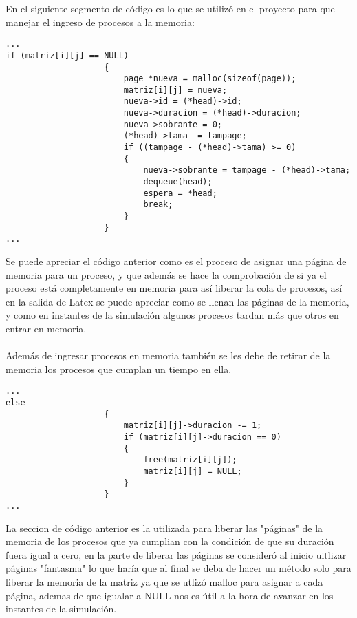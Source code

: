 \documentclass[10pt,a4paper]{article}
\begin{document}
En el siguiente segmento de código es lo que se utilizó en el proyecto para que manejar el ingreso de procesos a la memoria: 
\begin{verbatim}
...
if (matriz[i][j] == NULL)
                    {
                        page *nueva = malloc(sizeof(page));
                        matriz[i][j] = nueva;
                        nueva->id = (*head)->id;
                        nueva->duracion = (*head)->duracion;
                        nueva->sobrante = 0;
                        (*head)->tama -= tampage;
                        if ((tampage - (*head)->tama) >= 0)
                        {
                            nueva->sobrante = tampage - (*head)->tama;
                            dequeue(head);
                            espera = *head;
                            break;
                        }
                    }
...
\end{verbatim} 
\hfill
\hfill
\break
Se puede apreciar el código anterior como es el proceso de asignar una página de memoria para un proceso, y que además se hace la comprobación de si ya el proceso está completamente en memoria para así liberar la cola de procesos, así en la salida de Latex se puede apreciar como se llenan las páginas de la memoria, y como en instantes de la simulación algunos procesos tardan más que otros en entrar en memoria.\\\\
Además de ingresar procesos en memoria también se les debe de retirar de la memoria los procesos que cumplan un tiempo en ella.\\
\begin{verbatim}
...
else
                    {
                        matriz[i][j]->duracion -= 1;
                        if (matriz[i][j]->duracion == 0)
                        {
                            free(matriz[i][j]);
                            matriz[i][j] = NULL;
                        }
                    }
...
\end{verbatim} 
\hfill
\hfill
\break
La seccion de código anterior es la utilizada para liberar las "páginas" de la memoria de los procesos que ya cumplian con la condición de que su duración fuera igual a cero, en la parte de liberar las páginas se consideró al inicio uitlizar páginas "fantasma" lo que haría que al final se deba de hacer un método solo para liberar la memoria de la matriz ya que se utlizó malloc para asignar a cada página, ademas de que igualar a NULL nos es útil a la hora de avanzar en los instantes de la simulación. 
\hfill
\hfill
\break
\end{document}
